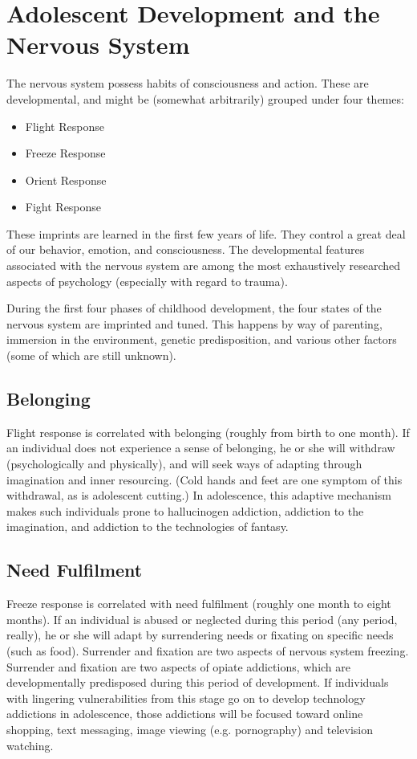 \documentclass[12pt,DIV9,oneside,headsepline,footsepline]{scrreprt}
\begin{document}
\section{Adolescent Development and the Nervous System}

The nervous system possess habits of consciousness and action.
These are developmental, and might be (somewhat arbitrarily) grouped
under four themes:

\begin{itemize}
\item Flight Response
\item Freeze Response
\item Orient Response
\item Fight Response
\end{itemize}

These imprints are learned in the first few years of life. They
control a great deal of our behavior, emotion, and consciousness. The
developmental features associated with the nervous system are among
the most exhaustively researched aspects of psychology (especially
with regard to trauma). 

During the first four phases of childhood development, the four states
of the nervous system are imprinted and tuned. This happens by way of
parenting, immersion in the environment, genetic predisposition, and
various other factors (some of which are still unknown).

\subsection{Belonging}

Flight response is correlated with belonging (roughly from birth to
one month). If an individual does not experience a sense of belonging,
he or she will withdraw (psychologically and physically), and will
seek ways of adapting through imagination and inner resourcing. (Cold
hands and feet are one symptom of this withdrawal, as is adolescent
cutting.) In adolescence, this adaptive mechanism makes such
individuals prone to hallucinogen addiction, addiction to the
imagination, and addiction to the technologies of fantasy.

\subsection{Need Fulfilment}

Freeze response is correlated with need fulfilment (roughly one month
to eight months). If an individual is abused or neglected during this
period (any period, really), he or she will adapt by surrendering
needs or fixating on specific needs (such as food). Surrender and
fixation are two aspects of nervous system freezing. Surrender and
fixation are two aspects of opiate addictions, which are
developmentally predisposed during this period of development. If
individuals with lingering vulnerabilities from this stage go on to
develop technology addictions in adolescence, those addictions will be
focused toward online shopping, text messaging, image viewing (e.g.
pornography) and television watching.
\end{document}
